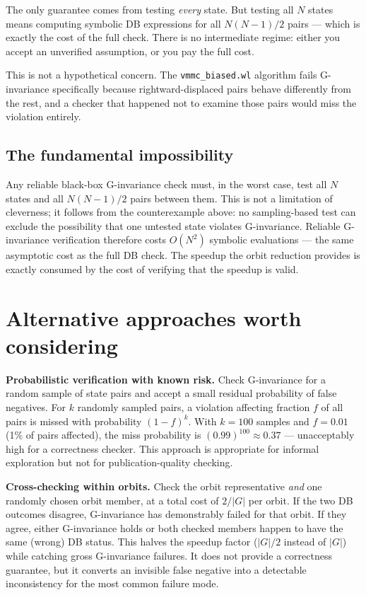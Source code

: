 \documentclass[11pt,a4paper]{article}
\begin{document}
The only guarantee comes from testing \emph{every} state.  But testing
all $N$ states means computing symbolic DB expressions for all $N(N-1)/2$
pairs --- which is exactly the cost of the full check.  There is no
intermediate regime: either you accept an unverified assumption, or you
pay the full cost.

This is not a hypothetical concern.  The \texttt{vmmc\_biased.wl}
algorithm fails G-invariance specifically because rightward-displaced
pairs behave differently from the rest, and a checker that happened not
to examine those pairs would miss the violation entirely.

\subsection*{The fundamental impossibility}

Any reliable black-box G-invariance check must, in the worst case, test
all $N$ states and all $N(N-1)/2$ pairs between them.  This is not a
limitation of cleverness; it follows from the counterexample above: no
sampling-based test can exclude the possibility that one untested state
violates G-invariance.  Reliable G-invariance verification therefore
costs $O(N^2)$ symbolic evaluations --- the same asymptotic cost as the
full DB check.  The speedup the orbit reduction provides is exactly
consumed by the cost of verifying that the speedup is valid.

\section{Alternative approaches worth considering}

\textbf{Probabilistic verification with known risk.}  Check G-invariance
for a random sample of state pairs and accept a small residual probability
of false negatives.  For $k$ randomly sampled pairs, a violation affecting
fraction $f$ of all pairs is missed with probability $(1-f)^k$.  With
$k=100$ samples and $f=0.01$ (1\% of pairs affected), the miss probability
is $(0.99)^{100}\approx0.37$ --- unacceptably high for a correctness
checker.  This approach is appropriate for informal exploration but not for
publication-quality checking.

\textbf{Cross-checking within orbits.}  Check the orbit representative
\emph{and} one randomly chosen orbit member, at a total cost of $2/|G|$
per orbit.  If the two DB outcomes disagree, G-invariance has
demonstrably failed for that orbit.  If they agree, either G-invariance
holds or both checked members happen to have the same (wrong) DB status.
This halves the speedup factor ($|G|/2$ instead of $|G|$) while catching
gross G-invariance failures.  It does not provide a correctness guarantee,
but it converts an invisible false negative into a detectable inconsistency
for the most common failure mode.
\end{document}
